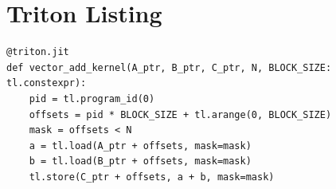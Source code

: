 \documentclass[lecture]{handout}
\begin{document}
\section{Triton Listing}
\begin{lstlisting}[language=Triton, caption={Triton vector add — tutorial 01-vector-add.py}]
@triton.jit
def vector_add_kernel(A_ptr, B_ptr, C_ptr, N, BLOCK_SIZE: tl.constexpr):
    pid = tl.program_id(0)
    offsets = pid * BLOCK_SIZE + tl.arange(0, BLOCK_SIZE)
    mask = offsets < N
    a = tl.load(A_ptr + offsets, mask=mask)
    b = tl.load(B_ptr + offsets, mask=mask)
    tl.store(C_ptr + offsets, a + b, mask=mask)
\end{lstlisting}
\end{document}
